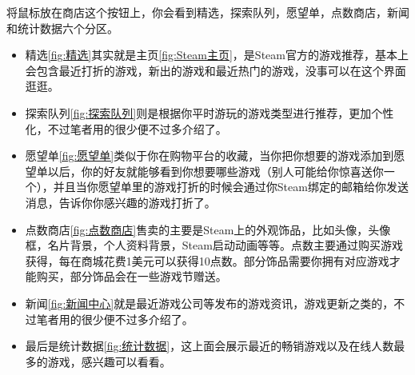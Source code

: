 \documentclass{article}
\begin{document}
        将鼠标放在商店这个按钮上，你会看到精选，探索队列，愿望单，点数商店，新闻和统计数据六个分区。
        \begin{itemize}
            \item 精选\ref{fig:精选}其实就是主页\ref{fig:Steam主页}，是Steam官方的游戏推荐，基本上会包含最近打折的游戏，新出的游戏和最近热门的游戏，没事可以在这个界面逛逛。
            \item 探索队列\ref{fig:探索队列}则是根据你平时游玩的游戏类型进行推荐，更加个性化，不过笔者用的很少便不过多介绍了。
            \item 愿望单\ref{fig:愿望单}类似于你在购物平台的收藏，当你把你想要的游戏添加到愿望单以后，你的好友就能够看到你想要哪些游戏（别人可能给你惊喜送你一个），并且当你愿望单里的游戏打折的时候会通过你Steam绑定的邮箱给你发送消息，告诉你你感兴趣的游戏打折了。
            \item 点数商店\ref{fig:点数商店}售卖的主要是Steam上的外观饰品，比如头像，头像框，名片背景，个人资料背景，Steam启动动画等等。点数主要通过购买游戏获得，每在商城花费1美元可以获得10点数。部分饰品需要你拥有对应游戏才能购买，部分饰品会在一些游戏节赠送。
            \item 新闻\ref{fig:新闻中心}就是最近游戏公司等发布的游戏资讯，游戏更新之类的，不过笔者用的很少便不过多介绍了。
            \item 最后是统计数据\ref{fig:统计数据}，这上面会展示最近的畅销游戏以及在线人数最多的游戏，感兴趣可以看看。
        \end{itemize}
\end{document}
